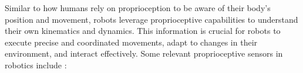 Similar to how humans rely on proprioception to be aware of their body's position and movement, robots leverage proprioceptive capabilities to understand their own kinematics and dynamics. This information is crucial for robots to execute precise and coordinated movements, adapt to changes in their environment, and interact effectively. Some relevant proprioceptive sensors in robotics include \cite{Siegwart2011Introductionautonomousmobile}:
